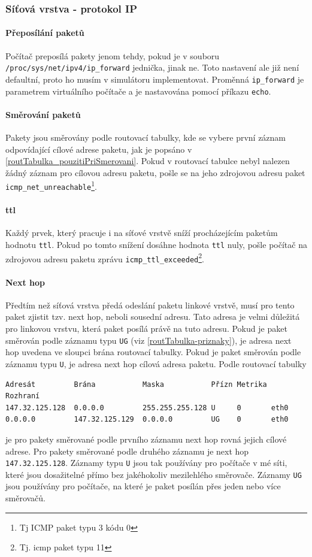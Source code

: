 \subsubsection{Síťová vrstva - protokol IP}

\paragraph{Přeposílání paketů}
Počítač preposílá pakety jenom tehdy, pokud je v souboru \verb|/proc/sys/net/ipv4/ip_forward| jednička, jinak ne. Toto nastavení ale již není defaultní, proto ho musím v simulátoru implementovat. Proměnná \verb|ip_forward| je parametrem virtuálního počítače a je nastavována pomocí příkazu \verb|echo|.
\paragraph{Směrování paketů}
Pakety jsou směrovány podle routovací tabulky, kde se vybere první záznam odpovídající cílové adrese paketu, jak je popsáno v \ref{routTabulka_pouzitiPriSmerovani}. Pokud v routovací tabulce nebyl nalezen žádný záznam pro cílovou adresu paketu, pošle se na jeho zdrojovou adresu paket \verb|icmp_net_unreachable|\footnote{Tj ICMP paket typu 3 kódu 0}.
\paragraph{ttl}
Každý prvek, který pracuje i na síťové vrstvě sníží procházejícím paketům hodnotu \verb|ttl|. Pokud po tomto snížení dosáhne hodnota \verb|ttl| nuly, pošle počítač na zdrojovou adresu paketu zprávu \verb|icmp_ttl_exceeded|\footnote{Tj. icmp paket typu 11}.
\paragraph{Next hop}
Předtím než síťová vrstva předá odeslání paketu linkové vrstvě, musí pro tento paket zjistit tzv. next hop, neboli sousední adresu. \cite{next_hop} Tato adresa je velmi důležitá pro linkovou vrstvu, která paket posílá právě na tuto adresu. Pokud je paket směrován podle záznamu typu \verb|UG| (viz \ref{routTabulka-priznaky}), je adresa next hop uvedena ve sloupci brána routovací tabulky. Pokud je paket směrován podle záznamu typu \verb|U|, je adresa next hop cílová adresa paketu. Podle routovací tabulky
\begin{verbatim}
Adresát         Brána           Maska           Přízn Metrika  Rozhraní
147.32.125.128  0.0.0.0         255.255.255.128 U     0       eth0
0.0.0.0         147.32.125.129  0.0.0.0         UG    0       eth0
\end{verbatim}
je pro pakety směrované podle prvního záznamu next hop rovná jejich cílové adrese. Pro pakety směrované podle druhého záznamu je next hop \verb|147.32.125.128|. Záznamy typu \verb|U| jsou tak používány pro počítače v mé síti, které jsou dosažitelné přímo bez jakéhokoliv mezilehlého směrovače. Záznamy \verb|UG| jsou používány pro počítače, na které je paket posílán přes jeden nebo více směrovačů.

